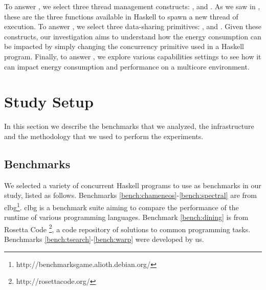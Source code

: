 To answer , we select three thread management constructs: \forkIO, \forkOn and \forkOS. As we saw in , these are the three functions available in Haskell to spawn a new thread of execution. To answer , we select three data-sharing primitives: \MVar, \TMVar and \TVar. Given these constructs, our investigation aims to understand how the energy consumption can be impacted by simply changing the concurrency primitive used in a Haskell program. Finally, to answer , we explore various capabilities settings to see how it can impact energy consumption and performance on a multicore environment.


\section{Study Setup}\label{sec:setup}
In this section we describe the benchmarks that we analyzed, the infrastructure and the methodology that we used to perform the experiments.

\subsection{Benchmarks}
We selected a variety of concurrent Haskell programs to use as benchmarks in our study, listed as follows. Benchmarks \ref{bench:chameneos}-\ref{bench:spectral} are from \ac{clbg}\footnote{http://benchmarksgame.alioth.debian.org/}. \acs{clbg} is a benchmark suite aiming to compare the performance of the runtime of various programming languages. Benchmark \ref{bench:dining} is from  Rosetta Code \footnote{http://rosettacode.org/}, a code repository of solutions to common programming tasks. Benchmarks \ref{bench:tsearch}-\ref{bench:warp} were developed by us.


